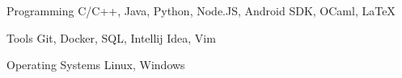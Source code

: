

\begin{cvskills}

  \cvskill
    {Programming} %
    {C/C++, Java, Python, Node.JS, Android SDK, OCaml, LaTeX} %

  \cvskill
    {Tools} %
    {Git, Docker, SQL, Intellij Idea, Vim} %

  \cvskill
    {Operating Systems} %
    {Linux, Windows} %


\end{cvskills}
